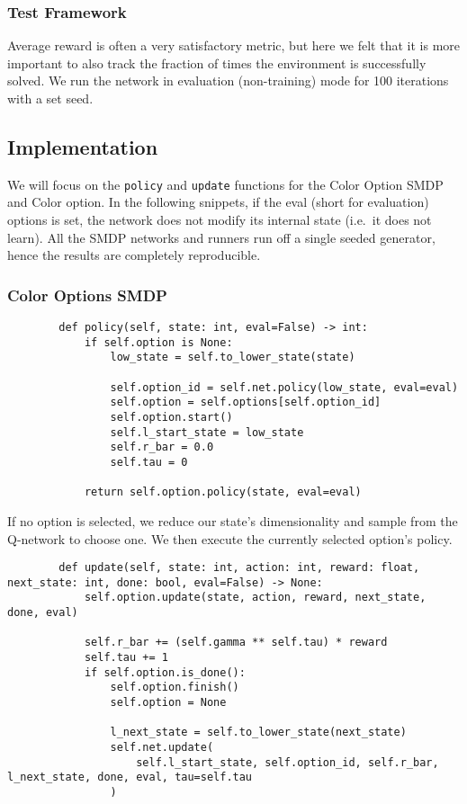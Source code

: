 \documentclass[A4]{article}
\begin{document}
    \subsubsection{Test Framework}
    Average reward is often a very satisfactory metric, but here we felt that it is more important to also track the fraction of times the environment is successfully solved.
    We run the network in evaluation (non-training) mode for 100 iterations with a set seed.

    \subsection{Implementation}
    We will focus on the \texttt{policy} and \texttt{update} functions for the Color Option SMDP and Color option.
    In the following snippets, if the eval (short for evaluation) options is set, the network does not modify its internal state (i.e.\ it does not learn).
    All the SMDP networks and runners run off a single seeded generator, hence the results are completely reproducible.

    \subsubsection{Color Options SMDP}
    \begin{verbatim}
        def policy(self, state: int, eval=False) -> int:
            if self.option is None:
                low_state = self.to_lower_state(state)

                self.option_id = self.net.policy(low_state, eval=eval)
                self.option = self.options[self.option_id]
                self.option.start()
                self.l_start_state = low_state
                self.r_bar = 0.0
                self.tau = 0

            return self.option.policy(state, eval=eval)
    \end{verbatim}

    If no option is selected, we reduce our state's dimensionality and sample from the Q-network to choose one.
    We then execute the currently selected option's policy.

    \begin{verbatim}
        def update(self, state: int, action: int, reward: float, next_state: int, done: bool, eval=False) -> None:
            self.option.update(state, action, reward, next_state, done, eval)

            self.r_bar += (self.gamma ** self.tau) * reward
            self.tau += 1
            if self.option.is_done():
                self.option.finish()
                self.option = None

                l_next_state = self.to_lower_state(next_state)
                self.net.update(
                    self.l_start_state, self.option_id, self.r_bar, l_next_state, done, eval, tau=self.tau
                )
    \end{verbatim}
\end{document}
